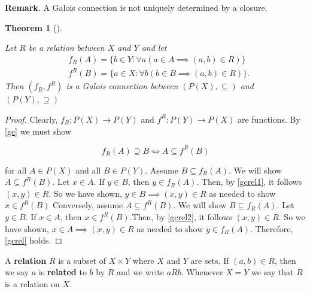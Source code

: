 \documentclass[
  letterpaper,
  10pt,
  reqno,
  twopage,
  openany]{book}
\theoremstyle{plain}
\theoremstyle{definition}
\theoremstyle{definition}
\theoremstyle{definition}
\theoremstyle{plain}
\theoremstyle{plain}
\newtheorem{theorem}{Theorem}[chapter]
\theoremstyle{remark}
\begin{document}
\textbf{Remark}. A Galois connection is not uniquely determined by a
closure.

\leavevmode{}%
\begin{theorem}[]\label{thm-gcrel}

Let \(R\) be a relation between \(X\) and \(Y\) and let \begin{align}
& f_R(A)=\{b\in Y:\forall a (a\in A\implies (a,b)\in R) \} \\
& f^R(B)=\{a\in X:\forall b (b\in B\implies (a,b)\in R) \}.
\end{align} Then \((f_R, f^R)\) is a Galois connection between
\((P(X),\subseteq)\) and \((P(Y),\supseteq)\)

\end{theorem}

\begin{proof}

Clearly, \(f_R:P(X)\to P(Y)\) and \(f^R:P(Y)\to P(X)\) are functions. By
\eqref{gc} we must show

\begin{equation}
\label{gcrel}
f_R(A)\supseteq B  \Longleftrightarrow A\subseteq f^R(B)
\end{equation}

for all \(A\in P(X)\) and all \(B\in P(Y)\). Assume
\(B\subseteq f_R(A)\). We will show \(A\subseteq f^R(B)\). Let
\(x\in A\). If \(y\in B\), then \(y\in f_R(A)\). Then, by
\eqref{gcrel1}, it follows \((x,y)\in R\). So we have shown,
\(y\in B\implies (x,y)\in R\) as needed to show \(x\in f^R(B)\)
Conversely, assume \(A\subseteq f^R(B)\). We will show
\(B\subseteq f_R(A)\). Let \(y\in B\). If \(x\in A\), then
\(x\in f^R(B)\).Then, by \eqref{gcrel2}, it follows \((x,y)\in R\). So
we have shown, \(x\in A\implies (x,y)\in R\) as needed to show
\(y\in f_R(A)\). Therefore, \eqref{gcrel} holds.

\end{proof}

A  \textbf{relation} \(R\) is a subset of \(X\times Y\)
where \(X\) and \(Y\) are sets. If \((a,b)\in R\), then we say \(a\) is
 \textbf{related} to \(b\) by \(R\) and we write \(aRb\).
Whenever \(X=Y\) we say that \(R\) is a relation on \(X\).
\end{document}
